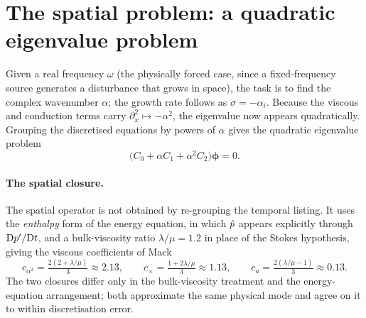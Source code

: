 \documentclass[11pt]{article}
\begin{document}
\section{The spatial problem: a quadratic eigenvalue problem}\label{sec:spatial}
Given a real frequency $\omega$ (the physically forced case, since a fixed-frequency source
generates a disturbance that grows in space), the task is to find the complex wavenumber $\alpha$;
the growth rate follows as $\sigma=-\alpha_i$. Because the viscous and conduction terms carry
$\partial_x^2\mapsto-\alpha^2$, the eigenvalue now appears quadratically. Grouping the discretised
equations by powers of $\alpha$ gives the quadratic eigenvalue problem
\begin{equation}\label{eq:qep}
  \big(C_0+\alpha C_1+\alpha^2C_2\big)\boldsymbol\phi=0 .
\end{equation}

\paragraph{The spatial closure.} The spatial operator is not obtained by re-grouping the temporal
listing. It uses the \emph{enthalpy} form of the energy equation, in which $\hat{p}$ appears
explicitly through $\mathrm{D} p'/\mathrm{D} t$, and a bulk-viscosity ratio $\lambda/\mu=1.2$ in place of the
Stokes hypothesis, giving the viscous coefficients of Mack \cite[Eq.~8.5]{mack1984}
\begin{equation}\label{eq:mackcoef}
  c_{\alpha^2}=\tfrac{2(2+\lambda/\mu)}{3}\approx2.13,\qquad
  c_\times=\tfrac{1+2\lambda/\mu}{3}\approx1.13,\qquad
  c_a=\tfrac{2(\lambda/\mu-1)}{3}\approx0.13 .
\end{equation}
The two closures differ only in the bulk-viscosity treatment and the energy-equation arrangement;
both approximate the same physical mode and agree on it to within discretisation error.
\end{document}
